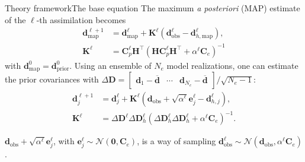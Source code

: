 \begin{frame}{Theory framework}{The base equation}
    The maximum \emph{a posteriori} (MAP) estimate of the $\ell$-th assimilation becomes
    \begin{subequations}
        \begin{align}
            \mathbf{d}^{\ell+1}_\text{map}
            &=
            \mathbf{d}^\ell_\text{map} +
            \mathbf{K}^\ell (\mathbf{d}^\ell_\text{obs} - \mathbf{d}^\ell_{h, \text{map}}), 
        \\
            \mathbf{K}^\ell 
            &= 
            \mathbf{C}^\ell_p \mathbf{H}^\top 
            (\mathbf{H}\mathbf{C}_p^\ell \mathbf{H}^\top + \alpha^\ell\mathbf{C}_e)^{-1}
        \end{align}
    \end{subequations}
    with $\mathbf{d}^0_\text{map} = \mathbf{d}^0_\text{prior}$.
    \vfill
    Using an ensemble of $N_e$ model realizations, one can estimate the prior covariances with 
    $\Delta\mathbf{D} = \begin{bmatrix}
        \mathbf{d}_1 - \overline{\mathbf{d}} & \cdots & 
        \mathbf{d}_{N_e} - \overline{\mathbf{d}}
    \end{bmatrix}/\sqrt{N_e-1}$:
    \begin{subequations}
        \begin{alignat}{4}
            \mathbf{d}_j^{\ell+1} 
            &=
            \mathbf{d}_j^\ell + \mathbf{K}^\ell
            (\mathbf{d}_\text{obs} + \sqrt{\alpha^\ell}\mathbf{e}_j^\ell - \mathbf{d}_{h,j}^\ell),
            \\
            \mathbf{K}^\ell 
            &=  
            \Delta\mathbf{D}^\ell\Delta\mathbf{D}^\ell_h
            (\Delta\mathbf{D}^\ell_h\Delta\mathbf{D}^\ell_h + \alpha^\ell\mathbf{C}_e)^{-1}.
            \label{eq:kalman-gain-l}
        \end{alignat}
    \label{eq:iteration_dsiesmda-no-loc}
    \end{subequations}

    $\mathbf{d}_\text{obs} + \sqrt{\alpha^\ell}\mathbf{e}_j^\ell$, 
    with $\mathbf{e}^\ell_j\sim\mathcal{N}(\mathbf{0}, \mathbf{C}_e)$,
    is a way of sampling 
    $\mathbf{d}_\text{obs}^\ell \sim 
    \mathcal{N}(\mathbf{d}_\text{obs}, \alpha^\ell\mathbf{C}_e)$. 
\end{frame}

